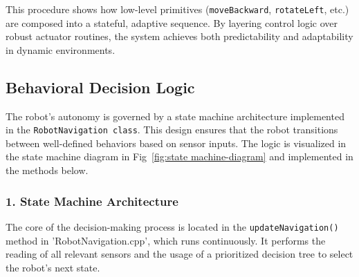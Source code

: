 \documentclass[conference]{IEEEtran}
\begin{document}
This procedure shows how low-level primitives (\texttt{moveBackward}, \texttt{rotateLeft}, etc.) are composed into a stateful, adaptive sequence. By layering control logic over robust actuator routines, the system achieves both predictability and adaptability in dynamic environments.

\subsection{Behavioral Decision Logic}

The robot's autonomy is governed by a state machine architecture implemented in the \texttt{RobotNavigation class}. This design ensures that the robot transitions between well-defined behaviors based on sensor inputs. The logic is visualized in the state machine diagram in Fig~\ref{fig:state machine-diagram} and implemented in the methods below.

\subsubsection*{\textbf{1. State Machine Architecture}}

The core of the decision-making process is located in the \texttt{updateNavigation()} method in 'RobotNavigation.cpp', which runs continuously. It performs the reading of all relevant sensors and the usage of a prioritized decision tree to select the robot's next state.
\end{document}
